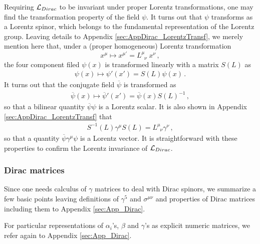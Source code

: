 Requiring ${\cal L}_{Dirac}$ to be invariant under proper Lorentz transformations,
one may find the transformation property of the field $\psi$.
It turns out that $\psi$ transforms as a Lorentz spinor, which 
belongs to the fundamental representation of the Lorentz group.
Leaving details to Appendix \ref{sec:AppDirac_LorentzTransf},
we merely mention here that, under a (proper homogeneous) Lorentz transformation 
\begin{equation}
x^\mu \mapsto x^{\mu'} = L^\mu_{\;\;\nu}\; x^\nu\,,
\end{equation}
the four component filed $\psi(x)$ is transformed linearly 
with a matrix $S(L)$ as
\begin{eqnarray}
\psi(x)
\mapsto
\psi'(x') 
= 
S(L) \psi(x)\,.
\end{eqnarray}
It turns out that the conjugate field $\overline{\psi}$
is transformed as
\begin{eqnarray}
\overline{\psi}(x)
\mapsto
\overline{\psi}'(x')
= 
\overline{\psi}(x) S(L)^{-1}\,,
\end{eqnarray}
so that a bilinear quantity $\overline{\psi} \psi$ is a Lorentz scalar.
It is also shown in Appendix \ref{sec:AppDirac_LorentzTransf} that
\begin{eqnarray}
S^{-1}(L) \gamma^\mu S(L) = L^\mu_{\;\;\nu} \gamma^\nu \,,
\label{eqn:LorentzTransfgamma}
\end{eqnarray}
so that a quantity $\overline{\psi} \gamma^\mu \psi$ is a Lorentz vector.
It is straightforward with these properties to confirm the Lorentz invariance of ${\cal L}_{Dirac}$.


\subsubsection{Dirac matrices}

Since one needs calculus of $\gamma$ matrices to deal with Dirac spinors,
we summarize a few basic points leaving 
definitions of  $\gamma^5$ and $\sigma^{\mu \nu}$ and
properties of  Dirac matrices including them
 to Appendix \ref{sec:App_Dirac}.

For particular representations of  $\alpha_i$'s, $\beta$ and $\gamma$'s as
explicit numeric matrices, we refer again to Appendix \ref{sec:App_Dirac}.

